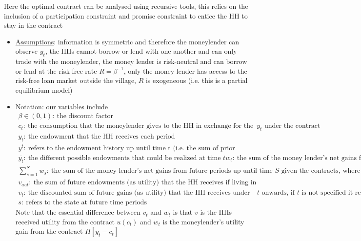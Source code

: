 \documentclass{article}
\begin{document}
Here the optimal contract can be analysed using recursive tools, this relies on the inclusion of a participation constraint and promise constraint to entice the HH to stay in the contract
\begin{itemize}
    \item  \underline{Assumptions}: information is symmetric and therefore the moneylender can observe $y_{t}$, the HHs cannot borrow or lend with one another and can only trade with the moneylender, the money lender is risk-neutral and can borrow or lend at the risk free rate $R = \beta^{-1}$, only the money lender has access to the risk-free loan market outside the village, $R$ is exogeneous (i.e. this is a partial equilibrium model)
    \item  \underline{Notation}: our variables include
    \begin{gather*}
    \beta \in (0,1): \ \text{the discount factor} \\
    c_{t}:\ \text{the consumption that the moneylender gives to the HH in exchange for the endowment $y_{t}$ under the contract} \\
    y_{t}:\ \text{the endowment that the HH receives each period} \\
    y^{t}:\ \text{refers to the endowment history up until time t (i.e. the sum of prior endowments)} \\
    \overline{y_{t}}: \ \text{the different possible endowments that could be realized at time $t$}
    w_{t}: \ \text{the sum of the money lender's net gains from each previous period's contract up until time t} \\
    \sum_{s=1}^{S} w_{s}: \ \text{the sum of the money lender's net gains from future periods up until time $S$ given the contracts, where $w_{s}$ refers to the net gain from the contract in a single future period $s$} \\
    v_{aut}: \ \text{the sum of future endowments (as utility) that the HH receives if living in autarky} \\
    v_{t}: \ \text{the discounted sum of future gains (as utility) that the HH receives under the contract from time $t$ onwards, if $t$ is not specified it refers to the present time onwards} \\
    s: \ \text{refers to the state at future time periods}
    \end{gather*}
    Note that the essential difference between $v_{t}$ and $w_{t}$ is that $v$ is the HHs received utility from the contract $u(c_{t})$ and $w_{t}$ is the moneylender's utility gain from the contract $\Pi[y_{t} - c_{t}]$

\end{itemize}
\end{document}
